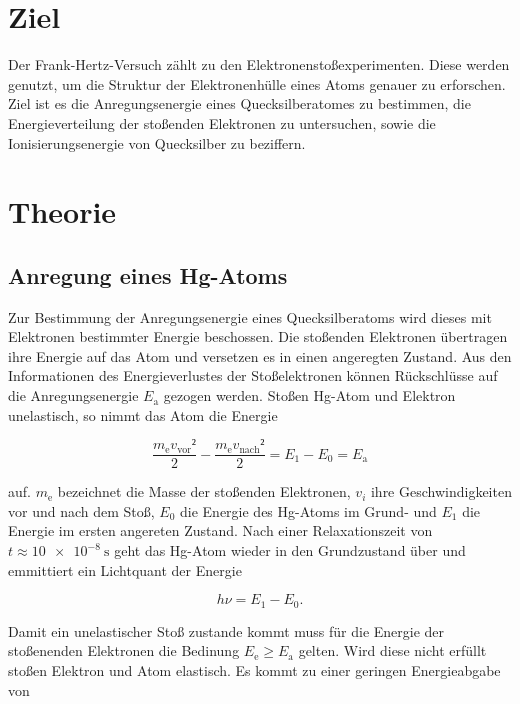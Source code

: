 \section{Ziel}
\label{sec:Ziel}
Der Frank-Hertz-Versuch zählt zu den Elektronenstoßexperimenten.  Diese werden genutzt, um die Struktur der Elektronenhülle eines Atoms genauer zu erforschen.
Ziel ist es die Anregungsenergie eines Quecksilberatomes zu bestimmen, die Energieverteilung der stoßenden Elektronen zu untersuchen, sowie die Ionisierungsenergie von Quecksilber zu beziffern.

\section{Theorie}
\label{sec:Theorie}
\subsection{Anregung eines Hg-Atoms}
Zur Bestimmung der Anregungsenergie eines Quecksilberatoms wird dieses mit Elektronen bestimmter Energie beschossen.
Die stoßenden Elektronen übertragen ihre Energie auf das Atom und versetzen es in einen angeregten Zustand.
 Aus den Informationen des Energieverlustes der Stoßelektronen können Rückschlüsse auf die Anregungsenergie $E_\mathup{a}$ gezogen werden. Stoßen Hg-Atom und Elektron unelastisch, so nimmt das Atom die Energie

\begin{equation}
	\label{eq:E_a}
	\frac{m_\mathup{e} v_\mathup{vor}²}{2}-\frac{m_\mathup{e} 	v_\mathup{nach}²}{2}=E_1-E_0=E_\mathup{a}
\end{equation}

auf.
$m_\mathup{e}$ bezeichnet die Masse der stoßenden Elektronen, $v_i$ ihre Geschwindigkeiten vor und nach dem Stoß, $E_0$ die Energie des Hg-Atoms im Grund- und $E_1$ die Energie im ersten angereten Zustand. 
Nach einer Relaxationszeit von $t \approx \SI{10e-8}{\second}$ geht das Hg-Atom wieder in den Grundzustand über und emmittiert ein Lichtquant der Energie
 
\begin{equation}
	h \nu =E_1-E_0.
\end{equation} 

Damit ein unelastischer Stoß zustande kommt muss für die Energie der stoßenenden Elektronen die Bedinung $E_\mathup{e} \geq E_\mathup{a}$ gelten. 
Wird diese nicht erfüllt stoßen Elektron und Atom elastisch. 
Es kommt zu einer geringen Energieabgabe von 

